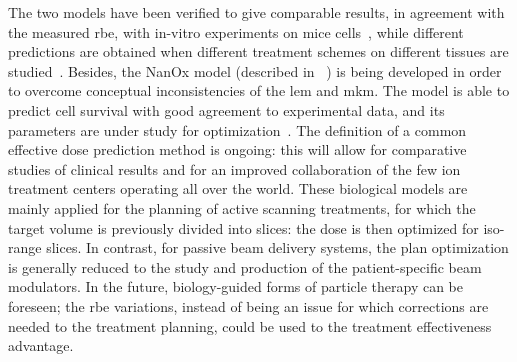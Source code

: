 The two models have been verified to give comparable results, in agreement with the measured \gls{rbe}, with in-vitro experiments on mice cells~\parencite{Uzawa2009}, while different predictions are obtained when different treatment schemes on different tissues are studied~\parencite{Fossati2012, Steinstrater2012}. Besides, the NanOx model (described in ~\cite{Cunha2017}) is being developed in order to overcome conceptual inconsistencies of the \gls{lem} and \gls{mkm}. The model is able to predict cell survival with good agreement to experimental data, and its parameters are under study for optimization~\parencite{Monini2018}. The definition of a common effective dose prediction method is ongoing: this will allow for comparative studies of clinical results and for an improved collaboration of the few ion treatment centers operating all over the world.
These biological models are mainly applied for the planning of active scanning treatments, for which the target volume is previously divided into slices: the dose is then optimized for iso-range slices. In contrast, for passive beam delivery systems, the plan optimization is generally reduced to the study and production of the patient-specific beam modulators. 
In the future, biology-guided forms of particle therapy can be foreseen; the \gls{rbe} variations, instead of being an issue for which corrections are needed to the treatment planning, could be used to the treatment effectiveness advantage.  
